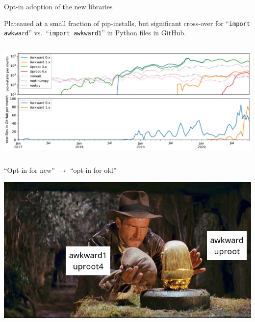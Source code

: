 \documentclass[aspectratio=169]{beamer}
\begin{document}
\begin{frame}{Opt-in adoption of the new libraries}
\large
\vspace{0.35 cm}

Plateaued at a small fraction of pip-installs, but significant cross-over for ``\texttt{import awkward}'' vs.\ ``\texttt{import awkward1}'' in Python files in GitHub.

\vspace{0.25 cm}
\begin{columns}
\includegraphics[width=\linewidth]{pip-github-anyone-awkward-uproot.pdf}
\end{columns}
\end{frame}

\begin{frame}{``Opt-in for new'' $\longrightarrow$ ``opt-in for old''}
\vspace{0.35 cm}
\begin{center}
\includegraphics[width=0.8\linewidth]{Raiders-of-the-Lost-Ark-Chamber.jpg}
\end{center}
\end{frame}
\end{document}
